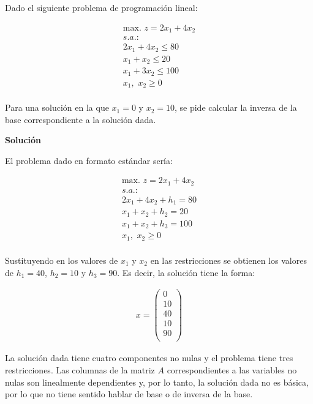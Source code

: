 Dado el siguiente problema de programación lineal:

\begin{equation}
\begin{split}
\mbox{max. } z = 2x_1 + 4x_2\\
s.a.:\\
2x_1 + 4x_2 \leq  80\\
 x_1 +  x_2 \leq 20\\
 x_1 + 3x_2 \leq 100\\
x_1,\,\,x_2\geq 0\\
\end{split}
\end{equation}

Para una solución en la que $x_1 = 0$ y $x_2 = 10$, se pide calcular la inversa de la base correspondiente a la solución dada.

\vspace{1cm}

\noindent
\textbf{Solución}

\vspace{0.5cm}

El problema dado en formato estándar sería:

\begin{equation}
\begin{split}
\mbox{max. } z = 2x_1 + 4x_2\\
s.a.:\\
2x_1 + 4x_2 + h_1 = 80\\
 x_1 +  x_2 + h_2 = 20\\
 x_1 +  x_2 + h_3 = 100\\
x_1,\,\,x_2\geq 0\\
\end{split}
\end{equation}

Sustituyendo en los valores de $x_1$ y $x_2$ en las restricciones se obtienen los valores de $h_1=40$, $h_2=10$ y $h_3=90$. Es decir, la solución tiene la forma:

\begin{equation}
\begin{split}
x=\begin{pmatrix}
0\\
10\\
40\\
10\\
90\\
\end{pmatrix}
\end{split}
\end{equation}


La solución dada tiene cuatro componentes no nulas y el problema tiene tres restricciones. Las columnas de la matriz $A$ correspondientes a las variables no nulas son linealmente dependientes y, por lo tanto, la solución dada no es básica, por lo que no tiene sentido hablar de base o de inversa de la base.